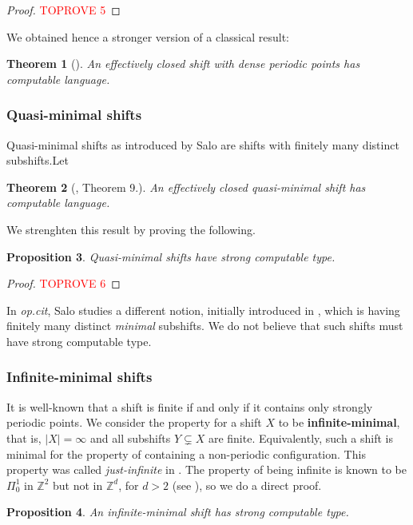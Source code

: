 \documentclass[french,american]{article}
\theoremstyle{plain}
\newtheorem{theorem}{Theorem}[section]
\newtheorem{proposition}[theorem]{Proposition}
\theoremstyle{definition}
\theoremstyle{remark}
\theoremstyle{plain}
\newcommand{\Z}{\mathbb{Z}}
\begin{document}
\begin{proof}\textcolor{red}{TOPROVE 5}\end{proof}
We obtained hence a stronger version of a classical result:
\begin{theorem}[\cite{kitchens2006periodic}]
\label{thm:periodic} An effectively closed shift with dense periodic points
has computable language.
\end{theorem}


\subsubsection{Quasi-minimal shifts}\label{sec:quasiminimal}

Quasi-minimal shifts as introduced by Salo \cite{salo2017decidability} are shifts with finitely many distinct subshifts.Let
\begin{theorem}[\cite{salo2017decidability}, Theorem 9.]
\label{thm:quasiminimal} An effectively closed quasi-minimal shift has computable
language.
\end{theorem}

We strenghten this result by proving the following.
\begin{proposition}
Quasi-minimal shifts have strong computable type.
\end{proposition}

\begin{proof}\textcolor{red}{TOPROVE 6}\end{proof}
In \emph{op.cit}, Salo studies a different notion, initially introduced
in \cite{delvenneblondel}, which is having finitely many distinct
\emph{minimal} subshifts. We do not believe that such shifts must
have strong computable type.

\subsubsection{Infinite-minimal shifts}\label{sec:infminimal}

It is well-known \cite[Theorem 3.8]{ballier2008structural} that a
shift is finite if and only if it contains only strongly periodic
points. We consider the property for a shift $X$ to be \textbf{infinite-minimal},
that is, $|X|=\infty$ and all subshifts $Y\subsetneq X$ are finite. 
Equivalently, such a shift is minimal for the property of containing a non-periodic configuration. This property was called \emph{just-infinite} in \cite{jeandel2017enumeration}.
The property of being infinite is known to be $\Pi_{0}^{1}$ in $\Z^{2}$
but not in $\Z^{d}$, for $d>2$ (see \cite{callard2022aperiodic}),
so we do a direct proof.
\begin{proposition}
An infinite-minimal shift has strong computable type.
\end{proposition}
\end{document}
